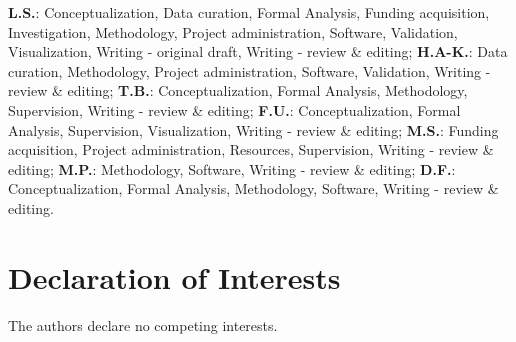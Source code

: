 \documentclass[5p,numafflabel]{elsarticle}
\begin{document}

\textbf{L.S.}:
Conceptualization,
Data curation,
Formal Analysis,
Funding acquisition,
Investigation,
Methodology,
Project administration,
Software,
Validation,
Visualization,
Writing - original draft,
Writing - review \& editing;
\textbf{H.A-K.}:
Data curation,
Methodology,
Project administration,
Software,
Validation,
Writing - review \& editing;
\textbf{T.B.}:
Conceptualization,
Formal Analysis,
Methodology,
Supervision,
Writing - review \& editing;
\textbf{F.U.}:
Conceptualization,
Formal Analysis,
Supervision,
Visualization,
Writing - review \& editing;
\textbf{M.S.}:
Funding acquisition,
Project administration,
Resources,
Supervision,
Writing - review \& editing;
\textbf{M.P.}:
Methodology,
Software,
Writing - review \& editing;
\textbf{D.F.}:
Conceptualization,
Formal Analysis,
Methodology,
Software,
Writing - review \& editing.


\section*{Declaration of Interests}

The authors declare no competing interests.

\renewcommand{\ttdefault}{\sfdefault}

\end{document}
